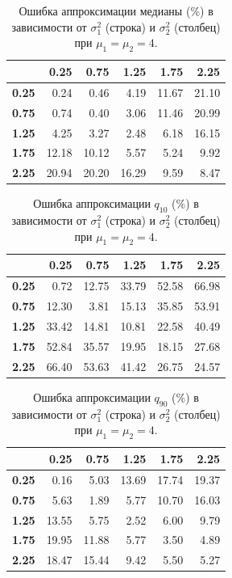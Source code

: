 \documentclass[12pt]{article}
\begin{document}
	\begin{table}[!hhh]
		\centering
		\caption{Ошибка аппроксимации медианы ($\%$) в зависимости от $\sigma_{1}^{2}$ (строка) и $\sigma_{2}^{2}$ (столбец) при $\mu_{1} = \mu_{2} = 4$.}
		\label{tab1}
		\begin{tabular}{rrrrrr}
			\hline
			& \textbf{0.25} & \textbf{0.75} & \textbf{1.25} & \textbf{1.75} & \textbf{2.25} \\ 
			\hline
			\textbf{0.25} & 0.24 & 0.46 & 4.19 & 11.67 & 21.10 \\ 
			\textbf{0.75} & 0.74 & 0.40 & 3.06 & 11.46 & 20.99 \\ 
			\textbf{1.25} & 4.25 & 3.27 & 2.48 & 6.18 & 16.15 \\ 
			\textbf{1.75} & 12.18 & 10.12 & 5.57 & 5.24 & 9.92 \\ 
			\textbf{2.25} & 20.94 & 20.20 & 16.29 & 9.59 & 8.47 \\ 
			\hline
		\end{tabular}
	\end{table}

\begin{table}[!hhh]
	\centering
	\caption{Ошибка аппроксимации $q_{10}$ ($\%$) в зависимости от $\sigma_{1}^{2}$ (строка) и $\sigma_{2}^{2}$ (столбец) при $\mu_{1} = \mu_{2} = 4$.}
	\label{tab2}
	\begin{tabular}{rrrrrr}
		\hline
		& \textbf{0.25} & \textbf{0.75} & \textbf{1.25} & \textbf{1.75} & \textbf{2.25} \\ 
		\hline
		\textbf{0.25} & 0.72 & 12.75 & 33.79 & 52.58 & 66.98 \\ 
		\textbf{0.75} & 12.30 & 3.81 & 15.13 & 35.85 & 53.91 \\ 
		\textbf{1.25} & 33.42 & 14.81 & 10.81 & 22.58 & 40.49 \\ 
		\textbf{1.75} & 52.84 & 35.57 & 19.95 & 18.15 & 27.68 \\ 
		\textbf{2.25} & 66.40 & 53.63 & 41.42 & 26.75 & 24.57 \\ 
		\hline
	\end{tabular}
\end{table}

\begin{table}[!hhh]
	\centering
	\caption{Ошибка аппроксимации $q_{90}$ ($\%$) в зависимости от $\sigma_{1}^{2}$ (строка) и $\sigma_{2}^{2}$ (столбец) при $\mu_{1} = \mu_{2} = 4$.}
	\label{tab3}
	\begin{tabular}{rrrrrr}
		\hline
		& \textbf{0.25} & \textbf{0.75} & \textbf{1.25} & \textbf{1.75} & \textbf{2.25} \\ 
		\hline
		\textbf{0.25} & 0.16 & 5.03 & 13.69 & 17.74 & 19.37 \\ 
		\textbf{0.75} & 5.63 & 1.89 & 5.77 & 10.70 & 16.03 \\ 
		\textbf{1.25} & 13.55 & 5.75 & 2.52 & 6.00 & 9.79 \\ 
		\textbf{1.75} & 19.95 & 11.88 & 5.77 & 3.50 & 4.89 \\ 
		\textbf{2.25} & 18.47 & 15.44 & 9.42 & 5.50 & 5.27 \\ 
		\hline
	\end{tabular}
\end{table}
	
\end{document}
